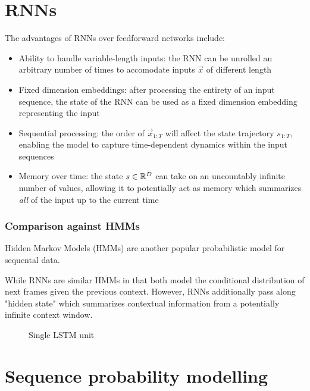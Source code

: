 
\section{RNNs}

The advantages of RNNs over feedforward networks include:
\begin{itemize}
    \item Ability to handle variable-length inputs: the RNN can be unrolled an arbitrary
        number of times to accomodate inputs $\vec{x}$ of different length
    \item Fixed dimension embeddings: after processing the entirety of an input
        sequence, the state of the RNN can be used as a fixed dimension embedding
        representing the input
    \item Sequential processing: the order of $\vec{x}_{1:T}$ will affect the state
        trajectory $s_{1:T}$, enabling the model to capture time-dependent dynamics
        within the input sequences
    \item Memory over time: the state $s \in \mathbb{R}^D$ can take on an uncountably infinite
        number of values, allowing it to potentially act as memory which summarizes
        \emph{all} of the input up to the current time
\end{itemize}

\subsubsection{Comparison against HMMs}

Hidden Markov Models (HMMs) are another popular probabilistic model for
sequental data. 

While RNNs are similar HMMs in that both model the conditional distribution of
next frames given the previous context. However, RNNs additionally pass along
"hidden state" which summarizes contextual information from a potentially
infinite context window.


\begin{figure}[tb]
    \centering
    
    \caption{Single LSTM unit}
    \label{fig:lstm-unit}
\end{figure}


\section{Sequence probability modelling}

